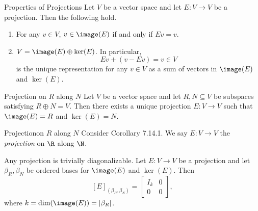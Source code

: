 \documentclass[linearalgebra]{subfiles}
\begin{document}
    \begin{prop}{Properties of Projections}
        Let $V$ be a vector space and let $E: V\to V$ be a projection. Then the following hold.
        \begin{enumerate}
            \item For any $v\in V$, $v\in \image(E)$ if and only if $Ev = v$.
            \item $V = \image(E)\oplus \ker(E)$. In particular,
                \begin{equation*}
                    Ev + (v-Ev) = v\in V
                \end{equation*}
                is the unique representation for any $v\in V$ as a sum of vectors in $\image(E)$ and $\ker(E)$.
        \end{enumerate}
    \end{prop}

    \begin{cor}{Projection on $R$ along $N$}
        Let $V$ be a vector space and let $R, N\subseteq V$ be subspaces satisfying $R\oplus N = V$. Then there exists a unique projection $E:V\to V$ such that $\image(E) = R$ and $\ker(E) = N$.
    \end{cor}	

    \begin{definition}{Projection}{on $R$ along $N$}
        Consider Corollary 7.14.1. We say $E:V\to V$ the \emph{projection} on $\R$ along $\N$.
    \end{definition}

    \begin{remark}
        Any projection is trivially diagonalizable. Let $E: V\to V$ be a projection and let $\beta_R,\beta_N$ be ordered bases for $\image(E)$ and $\ker(E)$. Then
        \begin{equation*}
            \left[ E \right]_{\left( \beta_R, \beta_N \right)} = \begin{bmatrix} I_k & 0 \\ 0 & 0 \end{bmatrix},
        \end{equation*}
        where $k = \dim(\image(E)) = \left| \beta_R \right|$.
    \end{remark}
\end{document}
